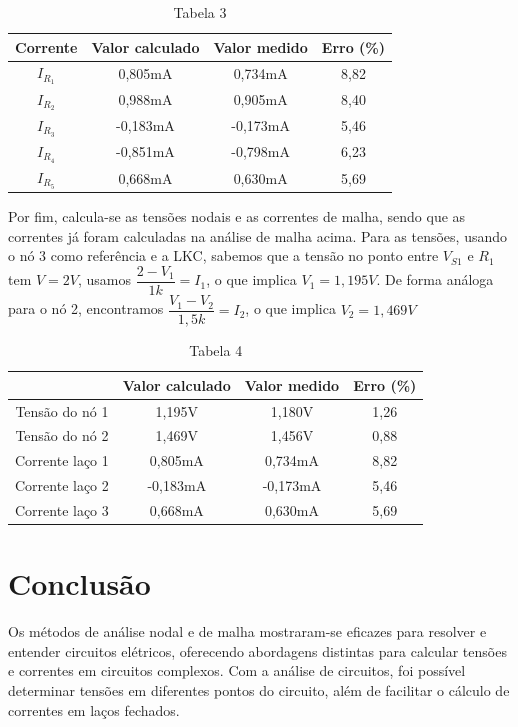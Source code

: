 \documentclass[a4 paper]{article}
\newcommand{\parag}{\hspace{30pt}}
\begin{document}
\vspace{5pt}
\begin{table}[h]
\centering
\begin{tabular}{|c|c|c|c|}
\hline
Corrente & Valor calculado & Valor medido & Erro (\%)\\ \hline
$I_{R_1} $ & 0,805mA & 0,734mA & 8,82 \\\hline 
$I_{R_2} $ & 0,988mA & 0,905mA & 8,40\\\hline
$I_{R_3} $ & -0,183mA & -0,173mA &5,46 \\\hline
$I_{R_4} $ & -0,851mA & -0,798mA &6,23 \\\hline
$I_{R_5} $ & 0,668mA & 0,630mA &5,69 \\\hline
\end{tabular}
\caption*{Tabela 3}
\end{table}

Por fim, calcula-se as tensões nodais e as correntes de malha, sendo que as correntes já foram calculadas na análise de malha acima. Para as tensões, usando o nó 3 como referência e a LKC, sabemos que a tensão no ponto entre $V_{S1}$ e $R_1$ tem $V=2V$, usamos $\dfrac{2-V_1}{1k}=I_1$, o que implica $V_1=1,195V$. De forma análoga para o nó 2, encontramos $\dfrac{V_1-V_2}{1,5k}=I_2$, o que implica $V_2=1,469V$

\vspace{5pt}
\begin{table}[h]
\centering
\begin{tabular}{|c|c|c|c|}
\hline
 & Valor calculado & Valor medido & Erro (\%)\\ \hline
Tensão do nó 1 & 1,195V & 1,180V & 1,26\\\hline
Tensão do nó 2 & 1,469V & 1,456V & 0,88\\\hline
Corrente laço 1 & 0,805mA & 0,734mA & 8,82 \\\hline
Corrente laço 2 & -0,183mA & -0,173mA &5,46 \\\hline
Corrente laço 3 & 0,668mA & 0,630mA & 5,69\\\hline

\end{tabular}
\caption*{Tabela 4}
\end{table}

\newpage
\section{Conclusão}
\parag Os métodos de análise nodal e de malha mostraram-se eficazes para resolver e entender circuitos elétricos, oferecendo abordagens distintas para calcular tensões e correntes em circuitos complexos. Com a análise de circuitos, foi possível determinar tensões em diferentes pontos do circuito, além de facilitar o cálculo de correntes em laços fechados.
\end{document}
